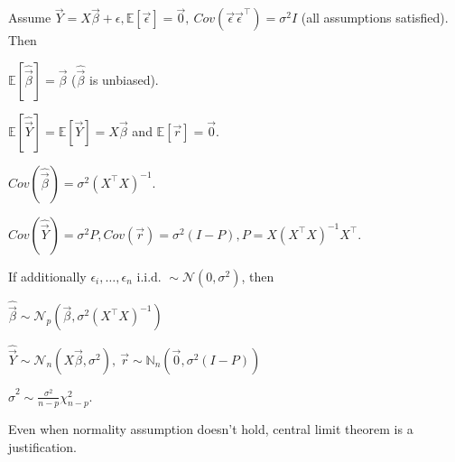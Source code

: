 \begin{notebox}\nospacing{}
  Assume $\vec{Y}=X\vec{\beta} + \epsilon, \mathbb{E}[\vec{\epsilon}]=\vec{0},\ Cov(\vec{\epsilon} \vec{\epsilon}^{\top}) = \sigma^{2}I$ (all assumptions satisfied). Then
  \begin{enumeratenosep}[label=\roman*]
    \item $\mathbb{E}[\hat{\vec{\beta}}] = \vec{\beta}$ ($\hat{\vec{\beta}}$ is unbiased).
    \item $\mathbb{E}[\hat{\vec{Y}}] = \mathbb{E}[\vec{Y}] = X\vec{\beta}$ and $\mathbb{E}[\vec{r}] = \vec{0}$.
    \item $Cov(\hat{\vec{\beta}}) = \sigma^{2}{(X^{\top}X)^{-1}}$.
    \item $Cov(\hat{\vec{Y}}) = \sigma^{2} P, Cov(\vec{r}) = \sigma^{2}(I-P), P=X(X^\top X)^{-1}X^\top$.
  \end{enumeratenosep}
  If additionally $\epsilon_{i}, \dots, \epsilon_{n} \text{ i.i.d. } \sim \mathcal{N}(0, \sigma^{2})$, then
  \begin{enumeratenosep}[label=\roman*]
    \item $\hat{\vec{\beta}} \sim \mathcal{N}_{p}{(\vec{\beta}, \sigma^{2}(X^{\top}X)^{-1})}$
    \item $\hat{\vec{Y}} \sim \mathcal{N}_{n}(X\vec{\beta}, \sigma^{2}),\ \vec{r} \sim \mathbb{N}_{n}(\vec{0}, \sigma^{2}(I-P))$
    \item $\hat \sigma^{2} \sim \frac{\sigma^{2}}{n-p}\chi^{2}_{n-p}$.
  \end{enumeratenosep}
  Even when normality assumption doesn't hold, central limit theorem is a justification.
\end{notebox}


